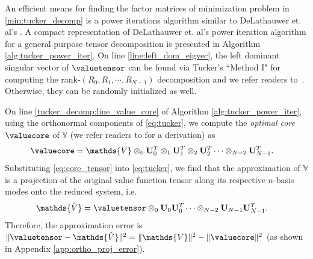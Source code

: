 An efficient means for finding the factor matrices of minimization problem in \ref{min:tucker_decomp}  is a power iterations algorithm similar to DeLathauwer et. al's \cite{DeLathauwer2000}. A compact representation of DeLathauwer et. al's power iteration algorithm for a general purpose tensor decomposition is presented in Algorithm \autoref{alg:tucker_power_iter}. On line \autoref{line:left_dom_eigvec}, the left dominant singular vector of $\valuetensor$ can be found via Tucker's ``Method I" for computing the rank-$\left(R_0, R_1, \cdots, R_{N-1}\right)$ decomposition and we refer readers to~\cite{Tucker66}. Otherwise, they can be randomly initialized as well.

On line \autoref{tucker_decomp:line_value_core} of Algorithm \autoref{alg:tucker_power_iter}, using the orthonormal components of \eqref{eq:tucker}, we compute the \textit{optimal core} $\valuecore$ of $\mathds{V}$  (we refer readers to \cite{DeLathauwer2000} for a derivation) as 
%
\begin{align}
		\valuecore  &= \mathds{V} \otimes_0 \mathbf{U}_0^T \otimes_1 \mathbf{U}_1^T \otimes_2 \mathbf{U}_2^T \cdots \otimes_{N-2} \mathbf{U}_{N-1}^T.
		\label{eq:core_tensor}
\end{align}
%
Substituting \eqref{eq:core_tensor} into \eqref{eq:tucker}, we find that the approximation of $\mathds{V}$ is  a projection of the original value function tensor along its respective $n$-basis modes onto the reduced system, i.e.
%
\begin{align}
	\mathds{\hat{V}}  &= \valuetensor \otimes_0 \mathbf{U}_0 \mathbf{U}_0^T    \cdots \otimes_{N-2} \mathbf{U}_{N-1} \mathbf{U}_{N-1}^T. 
	\label{eq:value_reduced}
\end{align}
%
Therefore, the approximation error is $\|\valuetensor - \mathds{\hat{V}}\|^2 = \|\mathds{V}\|^2 - \|\valuecore\|^2$ (as shown in Appendix \ref{app:ortho_proj_error}). 

